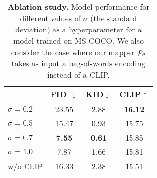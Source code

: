 
\vspace{-0.2cm}

\begin{table}[th!]
        \caption{\textbf{Ablation study.} Model performance for different values of $\sigma$ (the standard deviation) as a hyperparameter for a model trained on MS-COCO. 
    We also consider the case where our mapper ${\mathcal{P}}_\theta$ takes as input a bag-of-words encoding instead of a CLIP. 
    }
    \vskip 0.05in
    \centering
    \begin{tabular}{lccc}
    \toprule
               & FID $\downarrow$ & KID$\downarrow$ & CLIP$ \uparrow$\\
            \midrule
            $\sigma = 0.2$ & 23.55  & 2.88 & \textbf{16.12}\\
            $\sigma = 0.5$ & 15.47 & 0.93 & 15.75 \\
            $\sigma = 0.7$ & \textbf{7.55} & \textbf{0.61} & 15.85 \\
            $\sigma = 1.0$ & 7.87 & 1.66 & 15.81 \\
            \midrule
            w/o CLIP & 16.33 & 2.38 & 15.51 \\
\bottomrule
    \end{tabular}
    
    \label{tab:ablation_table}
\vspace{-0.2cm}
\end{table}
